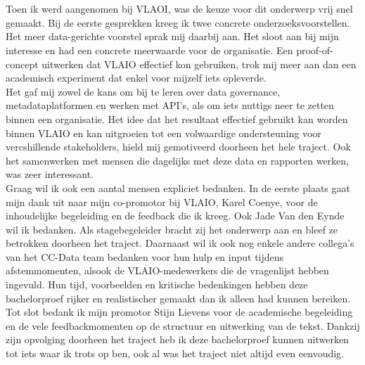
\chapter*{}%
\label{ch:voorwoord}


Toen ik werd aangenomen bij VLAOI, was de keuze voor dit onderwerp vrij snel gemaakt. 
Bij de eerste gesprekken kreeg ik twee concrete onderzoeksvoorstellen. Het meer data-ge\-rich\-te voorstel sprak mij daarbij aan. Het sloot aan bij mijn interesse en had een concrete meerwaarde voor de organisatie. Een proof-of-concept uitwerken dat VLAIO effectief kon gebruiken, trok mij meer aan dan een academisch experiment dat enkel voor mijzelf iets opleverde.\\

Het gaf mij zowel de kans om bij te leren over data governance, metadataplatformen en werken met API's, als om iets nuttigs neer te zetten binnen een organisatie. Het idee dat het resultaat effectief gebruikt kan worden binnen VLAIO en kan uitgroeien tot een volwaardige ondersteuning voor vercshillende stakeholders, hield mij gemotiveerd doorheen het hele traject. Ook het samenwerken met mensen die dagelijks met deze data en rapporten werken, was zeer interessant.\\

Graag wil ik ook een aantal mensen expliciet bedanken. In de eerste plaats gaat mijn dank uit naar mijn co-promotor bij VLAIO, Karel Coenye, voor de inhoudelijke begeleiding en de feedback die ik kreeg. Ook Jade Van den Eynde wil ik bedanken. Als stagebegeleider bracht zij het onderwerp aan en bleef ze betrokken doorheen het traject. Daarnaast wil ik ook nog enkele andere collega’s van het CC-Data team bedanken voor hun hulp en input  tijdens afstemmomenten, alsook de VLAIO-medewerkers die de vragenlijst hebben ingevuld. Hun tijd, voorbeelden en kritische bedenkingen hebben deze bachelorproef rijker en realistischer gemaakt dan ik alleen had kunnen bereiken.\\

Tot slot bedank ik mijn promotor Stijn Lievens voor de academische begeleiding en de vele feedbackmomenten op de structuur en uitwerking van de tekst. Dankzij zijn opvolging doorheen het traject heb ik deze bachelorproef kunnen uitwerken tot iets waar ik trots op ben, ook al was het traject niet altijd even eenvoudig.